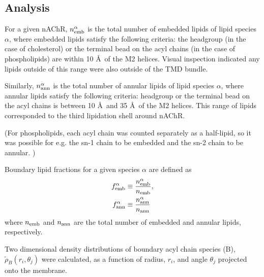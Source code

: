 

\subsection{Analysis}

For a given nAChR, $n_{\mathrm{emb}}^{\alpha}$ is the total number of embedded lipids of lipid species $\alpha$, where embedded lipids satisfy the following criteria: the headgroup (in the case of cholesterol) or the terminal bead on the acyl chains (in the case of phospholipids) are within 10 {\AA}~of the M2 helices. Visual inspection indicated any lipids outside of this range were also outside of the TMD bundle.

Similarly, $n_{\mathrm{ann}}^{\alpha}$ is the total number of annular lipids of lipid species $\alpha$, where annular lipids satisfy the following criteria:  headgroup or the terminal bead on the acyl chains is between 10 {\AA}~and 35 {\AA}~of the M2 helices. This range of lipids corresponded to the third lipidation shell around nAChR.

(For phospholipids, each acyl chain was counted separately as a half-lipid, so it was possible for e.g. the sn-1 chain to be embedded and the sn-2 chain to be annular. )

Boundary lipid fractions for a given species $\alpha$ are defined as 
\begin{eqnarray}
      f_{\mathrm{emb}}^{\alpha}&\equiv \frac{  n_{\mathrm{emb}}^{\alpha} }{n_{\mathrm{emb}} },\\
      f_{\mathrm{ann}}^{\alpha}&\equiv \frac{n_{\mathrm{ann}}^{\alpha}}{n_{\mathrm{ann}}}
    \label{eq:f}
  \end{eqnarray}
where $n_{\mathrm{emb}}$ and $n_{\mathrm{ann}}$ are the total number of embedded and annular lipids, respectively.  

Two dimensional density distributions of boundary acyl chain species (B), $\tilde{\rho}_{B}(r_i,\theta_j)$ were calculated, as a function of radius, $r_i$, and angle $\theta_j$ projected onto the membrane.

